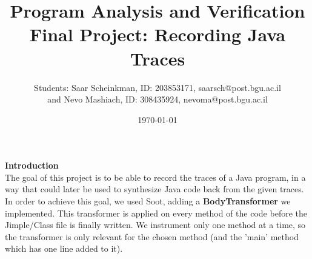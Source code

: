 \documentclass[10pt]{article}
\begin{document}
\title{Program Analysis and Verification\\Final Project: Recording Java Traces}
\author{Students: Saar Scheinkman, ID: 203853171, saarsch@post.bgu.ac.il\\and Nevo Mashiach, ID: 308435924, nevoma@post.bgu.ac.il}
\date{\today}

\maketitle

\textbf{Introduction} \\
The goal of this project is to be able to record the traces of a Java program, in a way that could later be used to synthesize Java code back from the given traces.
In order to achieve this goal, we used Soot, adding a \textbf{BodyTransformer} we implemented. This transformer is applied on every method of the code before the Jimple/Class file is finally written. We instrument only one method at a time, so the transformer is only relevant for the chosen method (and the 'main' method which has one line added to it).\\
\end{document}
